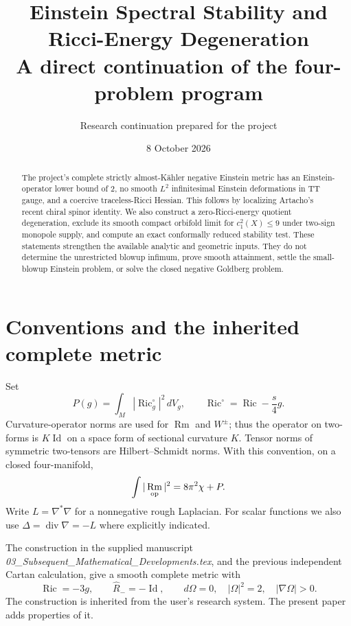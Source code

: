 \documentclass[11pt]{article}
\title{Einstein Spectral Stability and Ricci-Energy Degeneration\\\large A direct continuation of the four-problem program}
\author{Research continuation prepared for the project}
\date{8 October 2026}
\DeclareMathOperator{\Ric}{Ric}
\DeclareMathOperator{\Rm}{Rm}
\DeclareMathOperator{\Id}{Id}
\begin{document}
\maketitle
\begin{abstract}
The project's complete strictly almost-K\"ahler negative Einstein metric has an Einstein-operator lower bound of $2$, no smooth $L^2$ infinitesimal Einstein deformations in TT gauge, and a coercive traceless-Ricci Hessian. This follows by localizing Artacho's recent chiral spinor identity. We also construct a zero-Ricci-energy quotient degeneration, exclude its smooth compact orbifold limit for $c_1^2(X)\le9$ under two-sign monopole supply, and compute an exact conformally reduced stability test. These statements strengthen the available analytic and geometric inputs. They do not determine the unrestricted blowup infimum, prove smooth attainment, settle the small-blowup Einstein problem, or solve the closed negative Goldberg problem.
\end{abstract}

\section{Conventions and the inherited complete metric}
Set
\[
 P(g)=\int_M|\Ric^\circ_g|^2\,dV_g,\qquad
 \Ric^\circ=\Ric-\frac{s}{4}g.
\]
Curvature-operator norms are used for $\Rm$ and $W^\pm$; thus the operator on two-forms is $K\Id$ on a space form of sectional curvature $K$. Tensor norms of symmetric two-tensors are Hilbert--Schmidt norms. With this convention, on a closed four-manifold,
\begin{equation}\label{eq:GB}
 \int|\Rm_{\rm op}|^2=8\pi^2\chi+P.
\end{equation}
Write $L=\nabla^*\nabla$ for a nonnegative rough Laplacian. For scalar functions we also use $\Delta=\operatorname{div}\nabla=-L$ where explicitly indicated.

The construction in the supplied manuscript \emph{03\_Subsequent\_Mathematical\_Developments.tex}, and the previous independent Cartan calculation, give a smooth complete metric with
\begin{equation}\label{eq:inherited}
 \Ric=-3g,\qquad \widehat R_-=-\Id,\qquad
 d\Omega=0,\quad |\Omega|^2=2,\quad |\nabla\Omega|>0.
\end{equation}
The construction is inherited from the user's research system. The present paper adds properties of it.
\end{document}
